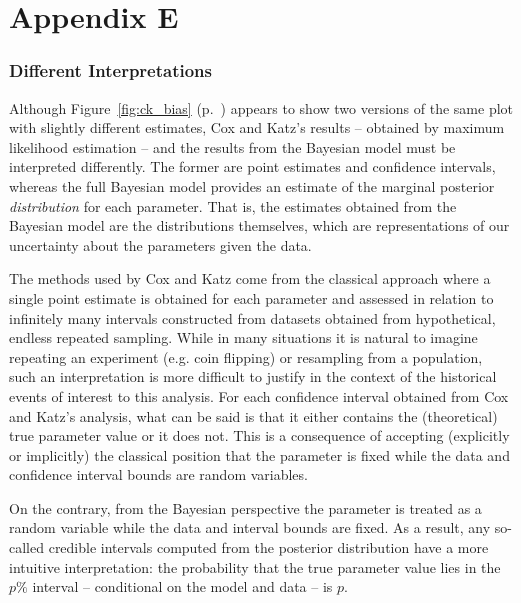 \chapter*{Appendix E}\label{AppendixE}
\vspace{-1.75cm}
\subsection{Different Interpretations}

Although Figure~\ref{fig:ck_bias} (p.~\pageref{fig:ck_bias}) appears to show two versions of the same plot with
slightly different estimates, Cox and Katz's results -- obtained by maximum likelihood estimation --
and the results from the Bayesian model must be interpreted differently. The former are point estimates 
and confidence intervals, whereas the full Bayesian model provides an estimate of the marginal posterior 
{\it distribution} for each parameter. That is, the estimates obtained from the Bayesian model are the 
distributions themselves, which are representations of our uncertainty about the parameters 
given the data. 

The methods used by Cox and Katz come from the classical approach where a single point 
estimate is obtained for each parameter and assessed in relation to infinitely many intervals 
constructed from datasets obtained from hypothetical, endless repeated sampling. While in many 
situations it is natural to imagine repeating an experiment (e.g. coin flipping) or resampling from 
a population, such an interpretation is more difficult to justify in the context of the historical 
events of interest to this analysis. For each confidence interval obtained from Cox and Katz's analysis, 
what can be said is that it either contains the (theoretical) true parameter value or it does not. This is 
a consequence of accepting (explicitly or implicitly) the classical position that the parameter is fixed 
while the data and confidence interval bounds are random variables. 

On the contrary, from the Bayesian perspective the parameter is treated as a random variable while 
the data and interval bounds are fixed. As a result, any so-called credible intervals computed from the 
posterior distribution have a more intuitive interpretation: the probability that the true parameter value lies 
in the $p\%$ interval  -- conditional on the model and data -- is $p$. 

